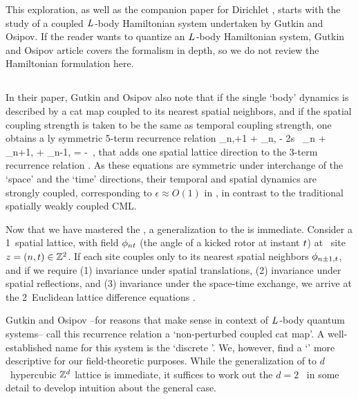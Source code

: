 This exploration, as well as the companion paper for
Dirichlet \bcs, starts with the study of a coupled ${L_{}}$-body
Hamiltonian system undertaken by Gutkin and Osipov. If the
reader wants to quantize an ${L_{}}$-body Hamiltonian system, Gutkin and Osipov
article covers the formalism in depth, so we do not review the
Hamiltonian formulation here.

\subsection{\catLatt}
\label{s:catLatt}

In their paper, Gutkin and Osipov also note that if the single `body'
dynamics is described by a cat map coupled to its nearest spatial
neighbors, and if the spatial coupling strength is taken to be the same
as temporal coupling strength, one obtains a {\spt}ly symmetric 5-term
recurrence relation
\beq
       \ssp_{n,\zeit+1} + \ssp_{n,}
- 2{s} \, \ssp_{n\zeit}
     + \ssp_{n+1,\zeit} + \ssp_{n-1, \zeit}
     = -
\,,
that adds one spatial lattice direction to  the {\templatt} 3-term
recurrence relation . As these equations are
symmetric under interchange of the `space' and the `time' directions,
their temporal and spatial dynamics are strongly coupled, corresponding to $\epsilon
\approx O(1)$ in , in contrast to the traditional
spatially weakly coupled CML.

Now that we have mastered the {\em \templatt} , a
generalization to the {\em \catlatt}  is
immediate. Consider a 1\dmn\ spatial lattice, with field $\phi_{nt}$
(the angle of a kicked rotor  at instant $t$) at
\spt\ site $z=(n,t)\in\mathbb{Z}^2$. If each site couples only to its
nearest spatial neighbors $\phi_{n\pm1,t}$, and if we require
(1) invariance under spatial translations,
(2) invariance under spatial reflections, and
(3) invariance under the space-time exchange,
we arrive at the 2\dmn\ Euclidean lattice difference equations
.

Gutkin and Osipov --for reasons that make sense in context of ${L_{}}$-body
quantum systems-- call this recurrence relation a `non-perturbed coupled
cat map'. A well-established name for this system is
the `discrete {\sPe}'. We, however, find a `\emph{\catlatt}' more descriptive
for our field-theoretic purposes.
While the generalization of  to $d$\dmn\ hypercubic
$\mathbb{Z}^d$ lattice is immediate, it suffices to work out the $d=2$
\catlatt\ in some detail to develop intuition about the general case.

